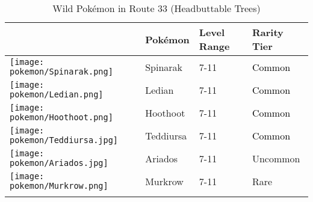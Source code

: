 \begin{longtable}{||l l l l||}%
\hline%
\rowcolor{GroundColor}%
&Pokémon&Level Range&Rarity Tier\\%
\hline%
\endhead%
\hline%
\rowcolor{GroundColor}%
\texttt{[image: pokemon/Spinarak.png]}&Spinarak&7{-}11&\textcolor{black}{%
Common%
}\\%
\hline%
\rowcolor{GroundColor}%
\texttt{[image: pokemon/Ledian.png]}&Ledian&7{-}11&\textcolor{black}{%
Common%
}\\%
\hline%
\rowcolor{GroundColor}%
\texttt{[image: pokemon/Hoothoot.png]}&Hoothoot&7{-}11&\textcolor{black}{%
Common%
}\\%
\hline%
\rowcolor{GroundColor}%
\texttt{[image: pokemon/Teddiursa.jpg]}&Teddiursa&7{-}11&\textcolor{black}{%
Common%
}\\%
\hline%
\rowcolor{GroundColor}%
\texttt{[image: pokemon/Ariados.jpg]}&Ariados&7{-}11&\textcolor{OliveGreen}{%
Uncommon%
}\\%
\hline%
\rowcolor{GroundColor}%
\texttt{[image: pokemon/Murkrow.png]}&Murkrow&7{-}11&\textcolor{RedOrange}{%
Rare%
}\\%
\hline%
\caption{Wild Pokémon in Route 33 (Headbuttable Trees)}%
\label{tab:Route33HeadbuttableTrees}%
\end{longtable}